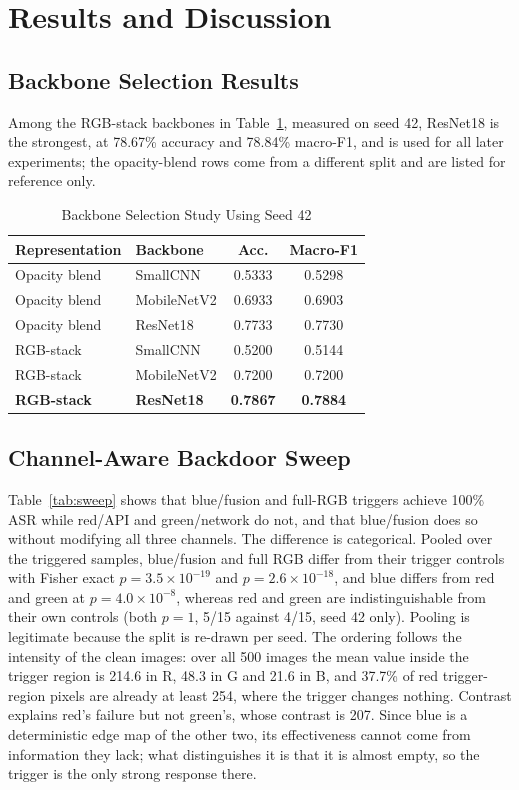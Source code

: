 \documentclass[conference]{IEEEtran}
\begin{document}
\section{Results and Discussion}
\subsection{Backbone Selection Results}
Among the RGB-stack backbones in Table~\ref{tab:backbone}, measured on seed 42, ResNet18 is the strongest, at 78.67\% accuracy and 78.84\% macro-F1, and is used for all later experiments; the opacity-blend rows come from a different split and are listed for reference only.

\begin{table}[h]
\caption{Backbone Selection Study Using Seed 42}
\label{tab:backbone}
\centering
\footnotesize
\begin{tabular}{llcc}
\toprule
\textbf{Representation} & \textbf{Backbone} & \textbf{Acc.} & \textbf{Macro-F1} \\
\midrule
Opacity blend & SmallCNN & 0.5333 & 0.5298 \\
Opacity blend & MobileNetV2 & 0.6933 & 0.6903 \\
Opacity blend & ResNet18 & 0.7733 & 0.7730 \\
RGB-stack & SmallCNN & 0.5200 & 0.5144 \\
RGB-stack & MobileNetV2 & 0.7200 & 0.7200 \\
\textbf{RGB-stack} & \textbf{ResNet18} & \textbf{0.7867} & \textbf{0.7884} \\
\bottomrule
\end{tabular}
\end{table}

\subsection{Channel-Aware Backdoor Sweep}

Table~\ref{tab:sweep} shows that blue/fusion and full-RGB triggers achieve 100\% ASR while red/API and green/network do not, and that blue/fusion does so without modifying all three channels. The difference is categorical. Pooled over the triggered samples, blue/fusion and full RGB differ from their trigger controls with Fisher exact $p = 3.5 \times 10^{-19}$ and $p = 2.6 \times 10^{-18}$, and blue differs from red and green at $p = 4.0 \times 10^{-8}$, whereas red and green are indistinguishable from their own controls (both $p = 1$, 5/15 against 4/15, seed 42 only). Pooling is legitimate because the split is re-drawn per seed. The ordering follows the intensity of the clean images: over all 500 images the mean value inside the trigger region is 214.6 in R, 48.3 in G and 21.6 in B, and 37.7\% of red trigger-region pixels are already at least 254, where the trigger changes nothing. Contrast explains red's failure but not green's, whose contrast is 207. Since blue is a deterministic edge map of the other two, its effectiveness cannot come from information they lack; what distinguishes it is that it is almost empty, so the trigger is the only strong response there.
\end{document}
